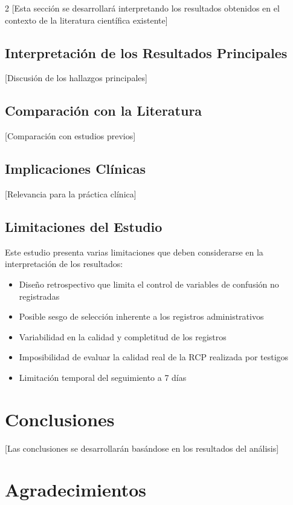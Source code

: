 \documentclass[10pt,a4paper]{article}
\begin{document}
\begin{multicols}{2}
[Esta sección se desarrollará interpretando los resultados obtenidos en el contexto de la literatura científica existente]

\subsection{Interpretación de los Resultados Principales}

[Discusión de los hallazgos principales]

\subsection{Comparación con la Literatura}

[Comparación con estudios previos]

\subsection{Implicaciones Clínicas}

[Relevancia para la práctica clínica]

\subsection{Limitaciones del Estudio}

Este estudio presenta varias limitaciones que deben considerarse en la interpretación de los resultados:

\begin{itemize}
\item Diseño retrospectivo que limita el control de variables de confusión no registradas
\item Posible sesgo de selección inherente a los registros administrativos
\item Variabilidad en la calidad y completitud de los registros
\item Imposibilidad de evaluar la calidad real de la RCP realizada por testigos
\item Limitación temporal del seguimiento a 7 días
\end{itemize}

\section{Conclusiones}

[Las conclusiones se desarrollarán basándose en los resultados del análisis]

\section{Agradecimientos}


\end{multicols}
\end{document}

